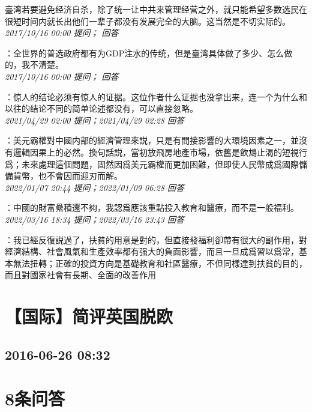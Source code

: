 \documentclass[twocolumn]{ctexart}
\begin{document}
臺湾若要避免经济自杀，除了统一让中共来管理经营之外，就只能希望多数选民在很短时间内就长出他们一辈子都没有发展完全的大脑。这当然是不切实际的。\\

\textit{\hfill\noindent\small 2017/10/16 00:00 提问； 回答}

：全世界的普选政府都有为GDP注水的传统，但是臺湾具体做了多少、怎么做的，我不清楚。\\

\textit{\hfill\noindent\small 2017/10/16 00:00 提问； 回答}

：惊人的结论必须有惊人的证据。这位作者什么证据也没拿出来，连一个为什么和以往的结论不同的简单论述都没有，可以直接忽略。\\

\textit{\hfill\noindent\small 2021/04/29 02:00 提问；2021/04/29 02:28 回答}

：美元霸權對中國内部的經濟管理來説，只是有間接影響的大環境因素之一，並沒有邏輯因果上的必然。換句話説，當初放飛房地產市場，依舊是飲鴆止渴的短視行爲；未來處理這個問題，固然因爲美元霸權而更加困難，但即使人民幣成爲國際儲備貨幣，也不會因而迎刃而解。
\\

\textit{\hfill\noindent\small 2022/01/07 20:44 提问；2022/01/09 06:28 回答}

：中國的財富纍積還不夠，我認爲應該重點投入教育和醫療，而不是一般福利。
\\

\textit{\hfill\noindent\small 2022/03/16 18:34 提问；2022/03/16 23:43 回答}

：我已經反復説過了，扶貧的用意是對的，但直接發福利卻帶有很大的副作用，對經濟結構、社會風氣和生產效率都有强大的負面影響，而且一旦成爲習以爲常，基本無法扭轉；正確的投資方向是基礎教育和社區醫療，不但同樣達到扶貧的目的，而且對國家社會有長期、全面的改善作用
\\


\section{【国际】简评英国脱欧}
\subsection{2016-06-26 08:32}


\section{8条问答}
\end{document}
